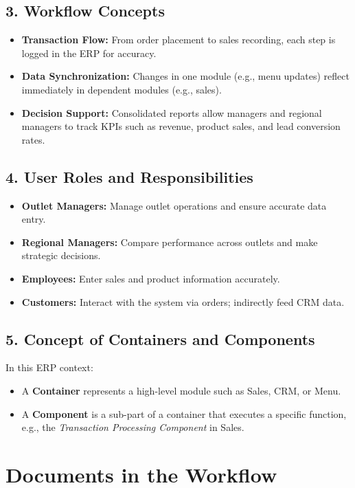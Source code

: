 \subsection*{3. Workflow Concepts}
\begin{itemize}
    \item \textbf{Transaction Flow:} From order placement to sales recording, each step is logged in the ERP for accuracy.
    \item \textbf{Data Synchronization:} Changes in one module (e.g., menu updates) reflect immediately in dependent modules (e.g., sales).
    \item \textbf{Decision Support:} Consolidated reports allow managers and regional managers to track KPIs such as revenue, product sales, and lead conversion rates.
\end{itemize}

\subsection*{4. User Roles and Responsibilities}
\begin{itemize}
    \item \textbf{Outlet Managers:} Manage outlet operations and ensure accurate data entry.
    \item \textbf{Regional Managers:} Compare performance across outlets and make strategic decisions.
    \item \textbf{Employees:} Enter sales and product information accurately.
    \item \textbf{Customers:} Interact with the system via orders; indirectly feed CRM data.
\end{itemize}

\subsection*{5. Concept of Containers and Components}
In this ERP context:
\begin{itemize}
    \item A \textbf{Container} represents a high-level module such as Sales, CRM, or Menu.
    \item A \textbf{Component} is a sub-part of a container that executes a specific function, e.g., the \emph{Transaction Processing Component} in Sales.
\end{itemize}

\section*{Documents in the Workflow}

